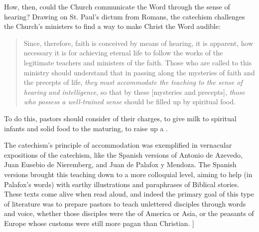 How, then, could the Church communicate the Word through the sense of hearing?
Drawing on St. Paul's dictum from Romans, the catechism challenges the Church's
ministers to find a way to make Christ the Word audible:
\begin{quote}
    Since, therefore, faith is conceived by means of hearing, it is apparent,
    how necessary it is for achieving eternal life to follow the works of the
    legitimate teachers and ministers of the faith. \Dots{} Those who are called
    to this ministry should understand that in passing along the mysteries of
    faith and the precepts of life, \emph{they must accommodate the teaching to
    the sense of hearing and intelligence}, so that by these [mysteries and
    precepts], \emph{those who possess a well-trained sense} should be filled up
    by spiritual food.%
        \Autocite
        [2, 8--9 (emphasis added): .]
        {Catholic:Catechismus1614}
\end{quote}
To do this, pastors should consider  of their charges, to give milk to
spiritual infants and solid food to the maturing, to raise up a .%
    \Autocite
    [8: .]
    {Catholic:Catechismus1614}

The catechism's principle of accommodation was exemplified in vernacular
expositions of the catechism, like the Spanish versions of Antonio de Azevedo,
Juan Eusebio de Nieremberg, and Juan de Palafox y Mendoza.%
    \Autocites{Azevedo:Catecismo}{Nieremberg:PracticaCatecismo}{Palafox:Bocados}
The Spanish versions brought this teaching down to a more colloquial level,
aiming to help  (in Palafox's words) with
earthy illustrations and paraphrases of Biblical stories.
These texts come alive when read aloud, and indeed the primary goal of this type
of literature was to prepare pastors to teach unlettered disciples through words
and voice, whether those disciples were the  of America or Asia,
or the peasants of Europe whose customs were still more pagan than Christian.%
    \Autocite
    [On Europe as a mission front after Trent, see][60--63]
    {Kamen:EarlyModernSociety}]

